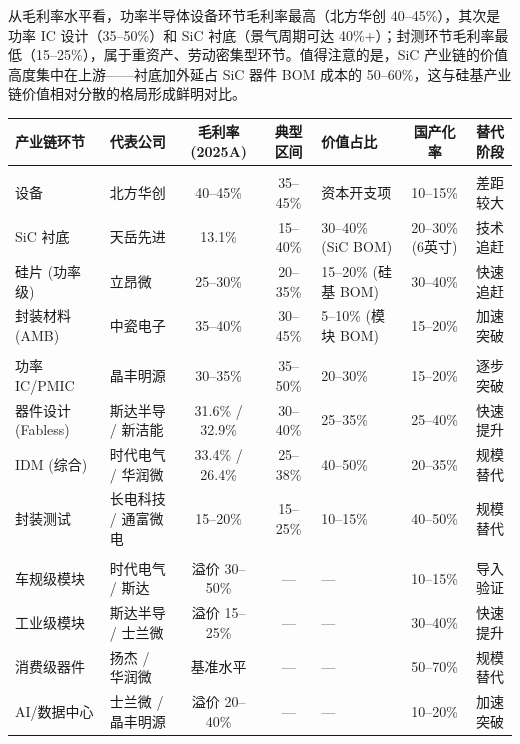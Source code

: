 从毛利率水平看，功率半导体设备环节毛利率最高（北方华创 40--45\%），其次是功率 IC 设计（35--50\%）和 SiC 衬底（景气周期可达 40\%+）；封测环节毛利率最低（15--25\%），属于重资产、劳动密集型环节。值得注意的是，SiC 产业链的价值高度集中在上游——衬底加外延占 SiC 器件 BOM 成本的 50--60\%，这与硅基产业链价值相对分散的格局形成鲜明对比。

\begin{exhibitbox}[表 2-3：功率半导体各环节价值分配与国产替代进度]
\centering
\small
\begin{tabularx}{\textwidth}{@{}l X c c X c c@{}}
\toprule
\textbf{产业链环节} & \textbf{代表公司} & \textbf{毛利率 (2025A)} & \textbf{典型区间} & \textbf{价值占比} & \textbf{国产化率} & \textbf{替代阶段} \\
\midrule
\rowcolor{navy!5}
\multicolumn{7}{l}{\textit{上游：材料与设备}} \\
设备 & 北方华创 & 40--45\% & 35--45\% & 资本开支项 & 10--15\% & 差距较大 \\
SiC 衬底 & 天岳先进 & 13.1\% & 15--40\% & 30--40\% (SiC BOM) & 20--30\% (6英寸) & 技术追赶 \\
硅片 (功率级) & 立昂微 & 25--30\% & 20--35\% & 15--20\% (硅基 BOM) & 30--40\% & 快速追赶 \\
封装材料 (AMB) & 中瓷电子 & 35--40\% & 30--45\% & 5--10\% (模块 BOM) & 15--20\% & 加速突破 \\
\midrule
\rowcolor{accentblue!5}
\multicolumn{7}{l}{\textit{中游：设计与制造}} \\
功率 IC/PMIC & 晶丰明源 & 30--35\% & 35--50\% & 20--30\% & 15--20\% & 逐步突破 \\
器件设计 (Fabless) & 斯达半导 / 新洁能 & 31.6\% / 32.9\% & 30--40\% & 25--35\% & 25--40\% & 快速提升 \\
IDM (综合) & 时代电气 / 华润微 & 33.4\% / 26.4\% & 25--38\% & 40--50\% & 20--35\% & 规模替代 \\
封装测试 & 长电科技 / 通富微电 & 15--20\% & 15--25\% & 10--15\% & 40--50\% & 规模替代 \\
\midrule
\rowcolor{riskgreen!5}
\multicolumn{7}{l}{\textit{下游应用端 (产品溢价)}} \\
车规级模块 & 时代电气 / 斯达 & 溢价 30--50\% & — & — & 10--15\% & 导入验证 \\
工业级模块 & 斯达半导 / 士兰微 & 溢价 15--25\% & — & — & 30--40\% & 快速提升 \\
消费级器件 & 扬杰 / 华润微 & 基准水平 & — & — & 50--70\% & 规模替代 \\
AI/数据中心 & 士兰微 / 晶丰明源 & 溢价 20--40\% & — & — & 10--20\% & 加速突破 \\
\bottomrule
\end{tabularx}
\vspace{0.2cm}
\end{exhibitbox}

